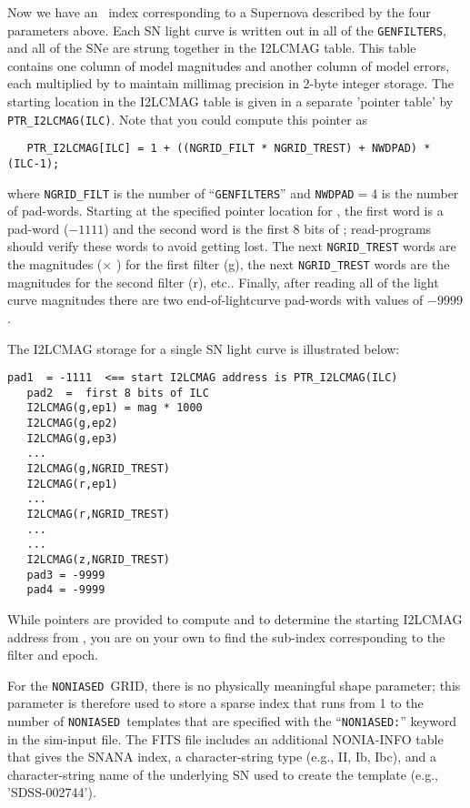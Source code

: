 \documentclass[12pt]{article}
\newcommand{\NONIA}{{\tt NONIASED}}
\begin{document}
Now we have an \ILC\ index corresponding to a Supernova described 
by the four parameters above. Each SN light curve is written out
in all of the {\tt GENFILTERS}, and all of the SNe are strung together
in the I2LCMAG table. This table contains one column of
model magnitudes and another column of model errors, 
each multiplied by {\MAGPACK} to maintain millimag precision 
in 2-byte integer storage.
The starting location in the I2LCMAG table
is given in a separate 'pointer table' by {\tt PTR\_I2LCMAG(ILC)}.
Note that you could compute this pointer as
%
\begin{verbatim}
   PTR_I2LCMAG[ILC] = 1 + ((NGRID_FILT * NGRID_TREST) + NWDPAD) * (ILC-1);
\end{verbatim}
%
where {\tt NGRID\_FILT} is the number of ``{\tt GENFILTERS}''
and {\tt NWDPAD}$=4$ is the number of pad-words.
Starting at the specified pointer location for {\ILC},
the first word is a pad-word ($-1111$) and the second word
is the first 8 bits of {\ILC}; read-programs should verify these
words to avoid getting lost.
The next {\tt NGRID\_TREST} words are the magnitudes 
($\times$ {\MAGPACK})
for the first filter (g), the next {\tt NGRID\_TREST} words are
the magnitudes for the second filter (r), etc..
Finally, after reading all of the light curve magnitudes there
are two end-of-lightcurve pad-words with values of $-9999$.


The I2LCMAG  storage for a single SN light curve 
is illustrated below:
%
\begin{Verbatim}[frame=single]
   pad1  = -1111  <== start I2LCMAG address is PTR_I2LCMAG(ILC)
   pad2  =  first 8 bits of ILC
   I2LCMAG(g,ep1) = mag * 1000
   I2LCMAG(g,ep2)
   I2LCMAG(g,ep3)
   ...
   I2LCMAG(g,NGRID_TREST)
   I2LCMAG(r,ep1)
   ...
   I2LCMAG(r,NGRID_TREST)
   ...
   ...
   I2LCMAG(z,NGRID_TREST) 
   pad3 = -9999
   pad4 = -9999
\end{Verbatim}
%
While pointers are provided to compute {\ILC}
and to determine the starting I2LCMAG address from {\ILC},
you are on your own to find the sub-index 
corresponding to the filter and epoch.

\bigskip
For the \NONIA\ GRID, there is no physically meaningful 
shape parameter; this parameter is therefore used 
to store a sparse index that runs from 1 to the number 
of \NONIA\ templates that are specified with the 
``{\tt NON1ASED:}''  keyword in the sim-input file.
The FITS file includes an additional NONIA-INFO table that gives
the SNANA index, a character-string type (e.g., II, Ib, Ibc),
and a character-string name of the underlying SN used to 
create the template (e.g., 'SDSS-002744').
\end{document}
